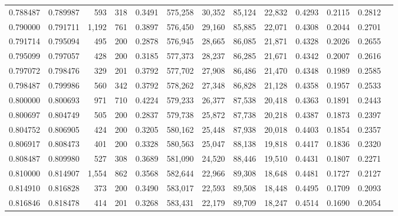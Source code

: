 \begin{tabular}{rrrrrrrrrrrrr}
0.788487 & 0.789987 &   593 & 318 &                                     0.3491 & 575,258 &  30,352 &  85,124 &  22,832 & 0.4293 & 0.2115 & 0.2812 \\
0.790000 & 0.791711 & 1,192 & 761 &                                     0.3897 & 576,450 &  29,160 &  85,885 &  22,071 & 0.4308 & 0.2044 & 0.2701 \\
0.791714 & 0.795094 &   495 & 200 &                                     0.2878 & 576,945 &  28,665 &  86,085 &  21,871 & 0.4328 & 0.2026 & 0.2655 \\
0.795099 & 0.797057 &   428 & 200 &                                     0.3185 & 577,373 &  28,237 &  86,285 &  21,671 & 0.4342 & 0.2007 & 0.2616 \\
0.797072 & 0.798476 &   329 & 201 &                                     0.3792 & 577,702 &  27,908 &  86,486 &  21,470 & 0.4348 & 0.1989 & 0.2585 \\
0.798487 & 0.799986 &   560 & 342 &                                     0.3792 & 578,262 &  27,348 &  86,828 &  21,128 & 0.4358 & 0.1957 & 0.2533 \\
0.800000 & 0.800693 &   971 & 710 &                                     0.4224 & 579,233 &  26,377 &  87,538 &  20,418 & 0.4363 & 0.1891 & 0.2443 \\
0.800697 & 0.804749 &   505 & 200 &                                     0.2837 & 579,738 &  25,872 &  87,738 &  20,218 & 0.4387 & 0.1873 & 0.2397 \\
0.804752 & 0.806905 &   424 & 200 &                                     0.3205 & 580,162 &  25,448 &  87,938 &  20,018 & 0.4403 & 0.1854 & 0.2357 \\
0.806917 & 0.808473 &   401 & 200 &                                     0.3328 & 580,563 &  25,047 &  88,138 &  19,818 & 0.4417 & 0.1836 & 0.2320 \\
0.808487 & 0.809980 &   527 & 308 &                                     0.3689 & 581,090 &  24,520 &  88,446 &  19,510 & 0.4431 & 0.1807 & 0.2271 \\
0.810000 & 0.814907 & 1,554 & 862 &                                     0.3568 & 582,644 &  22,966 &  89,308 &  18,648 & 0.4481 & 0.1727 & 0.2127 \\
0.814910 & 0.816828 &   373 & 200 &                                     0.3490 & 583,017 &  22,593 &  89,508 &  18,448 & 0.4495 & 0.1709 & 0.2093 \\
0.816846 & 0.818478 &   414 & 201 &                                     0.3268 & 583,431 &  22,179 &  89,709 &  18,247 & 0.4514 & 0.1690 & 0.2054 \\

\end{tabular}
